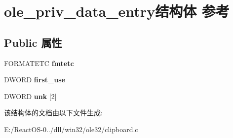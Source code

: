 \hypertarget{structole__priv__data__entry}{}\section{ole\+\_\+priv\+\_\+data\+\_\+entry结构体 参考}
\label{structole__priv__data__entry}
\subsection*{Public 属性}
\begin{DoxyCompactItemize}
\item 
\mbox{\label{structole__priv__data__entry_a2fa30d6e37e3be9642b611438a84384d}} 
F\+O\+R\+M\+A\+T\+E\+TC {\bfseries fmtetc}
\item 
\mbox{\label{structole__priv__data__entry_a85a9c480112f7aabb633050761315f21}} 
D\+W\+O\+RD {\bfseries first\+\_\+use}
\item 
\mbox{\label{structole__priv__data__entry_a1fd487c48f18b0abc80317ef947041d8}} 
D\+W\+O\+RD {\bfseries unk} \mbox{[}2\mbox{]}
\end{DoxyCompactItemize}


该结构体的文档由以下文件生成\+:\begin{DoxyCompactItemize}
\item 
E\+:/\+React\+O\+S-\/0../dll/win32/ole32/clipboard.\+c\end{DoxyCompactItemize}
